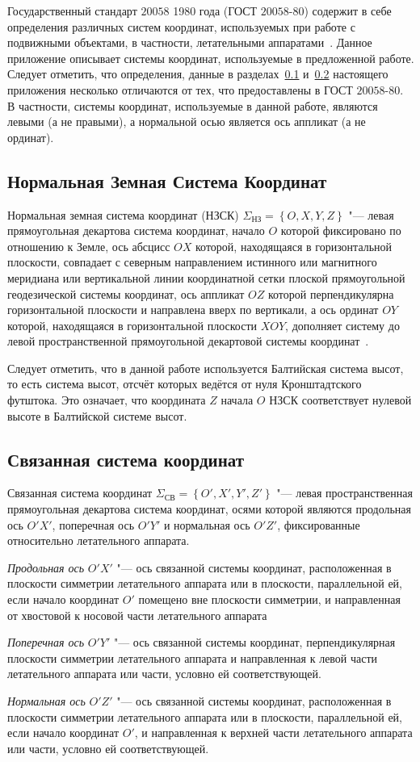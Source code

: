 \documentclass[../main.tex]{subfiles}
\begin{document}
Государственный стандарт $20058$ 1980 года (ГОСТ $20058$-$80$) содержит в себе определения различных систем координат, используемых при работе с подвижными объектами, в частности, летательными аппаратами~\cite{GOST-CS:1980}. Данное приложение описывает системы координат, используемые в предложенной работе. Следует отметить, что определения, данные в разделах~\ref{sec:nzsk} и~\ref{sec:ssk} настоящего приложения несколько отличаются от тех, что предоставлены в ГОСТ $20058$-$80$. В частности, системы координат, используемые в данной работе, являются левыми (а не правыми), а нормальной осью является ось аппликат (а не ординат).

\subsection{Нормальная Земная Система Координат}\label{sec:nzsk}
Нормальная земная система координат (НЗСК) $\Sigma_{\text{НЗ}} = \left\{O, X, Y, Z\right\}$ "--- левая прямоугольная декартова система координат, начало $O$ которой фиксировано по отношению к Земле, ось абсцисс $OX$ которой, находящаяся в горизонтальной плоскости, совпадает с северным направлением истинного или магнитного меридиана или вертикальной линии координатной сетки плоской прямоугольной геодезической системы координат, ось аппликат $OZ$ которой перпендикулярна горизонтальной плоскости и направлена вверх по вертикали, а ось ординат $OY$ которой, находящаяся в горизонтальной плоскости $XOY$, дополняет систему до левой пространственной прямоугольной декартовой системы координат~\cite{GOST-CS:1980}.

Следует отметить, что в данной работе используется Балтийская система высот, то есть система высот, отсчёт которых ведётся от нуля Кронштадтского футштока. Это означает, что координата $Z$ начала $O$ НЗСК соответствует нулевой высоте в Балтийской системе высот.

\subsection{Связанная система координат}\label{sec:ssk}
Связанная система координат $\Sigma_{\text{СВ}} = \left\{O', X', Y', Z'\right\}$ "--- левая пространственная прямоугольная декартова система координат, осями которой являются продольная ось $O'X'$, поперечная ось $O'Y'$ и нормальная ось $O'Z'$, фиксированные относительно летательного аппарата.

\textit{Продольная ось} $O'X'$ "--- ось связанной системы координат, расположенная в плоскости симметрии летательного аппарата или в плоскости, параллельной ей, если начало координат $O'$ помещено вне плоскости симметрии, и направленная от хвостовой к носовой части летательного аппарата

\textit{Поперечная ось} $O'Y'$ "--- ось связанной системы координат, перпендикулярная плоскости симметрии летательного аппарата и направленная к левой части летательного аппарата или части, условно ей соответствующей.

\textit{Нормальная ось} $O'Z'$ "--- ось связанной системы координат, расположенная в плоскости симметрии летательного аппарата или в плоскости, параллельной ей, если начало координат $O'$, и направленная к верхней части летательного аппарата или части, условно ей соответствующей.
\end{document}
